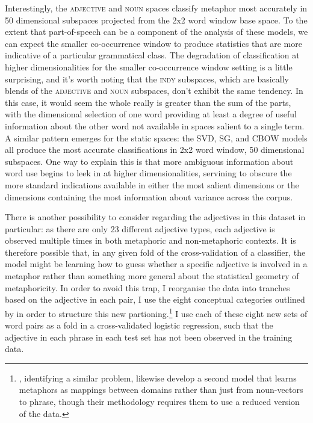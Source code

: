 Interestingly, the \textsc{adjective} and \textsc{noun} spaces classify metaphor most accurately in 50 dimensional subspaces projected from the 2x2 word window base space.  To the extent that part-of-speech can be a component of the analysis of these models, we can expect the smaller co-occurrence window to produce statistics that are more indicative of a particular grammatical class.  The degradation of classification at higher dimensionalities for the smaller co-occurrence window setting is a little surprising, and it's worth noting that the \textsc{indy} subspaces, which are basically blends of the \textsc{adjective} and \textsc{noun} subspaces, don't exhibit the same tendency.  In this case, it would seem the whole really is greater than the sum of the parts, with the dimensional selection of one word providing at least a degree of useful information about the other word not available in spaces salient to a single term.  A similar pattern emerges for the static spaces: the \textsc{SVD}, \textsc{SG}, and \textsc{CBOW} models all produce the most accurate classifications in 2x2 word window, 50 dimensional subspaces.  One way to explain this is that more ambiguous information about word use begins to leek in at higher dimensionalities, servining to obscure the more standard indications available in either the most salient dimensions or the dimensions containing the most information about variance across the corpus.

There is another possibility to consider regarding the adjectives in this dataset in particular: as there are only 23 different adjective types, each adjective is observed multiple times in both metaphoric and non-metaphoric contexts.  It is therefore possible that, in any given fold of the cross-validation of a classifier, the model might be learning how to guess whether a specific adjective is involved in a metaphor rather than something more general about the statistical geometry of metaphoricity.  In order to avoid this trap, I reorganise the data into tranches based on the adjective in each pair, I use the eight conceptual categories outlined by \cite{GutierrezEA2016} in order to structure this new partioning.\footnote{\cite{GutierrezEA2016}, identifying a similar problem, likewise develop a second model that learns metaphors as mappings between domains rather than just from noun-vectors to phrase, though their methodology requires them to use a reduced version of the data.}  I use each of these eight new sets of word pairs as a fold in a cross-validated logistic regression, such that the adjective in each phrase in each test set has not been observed in the training data.

